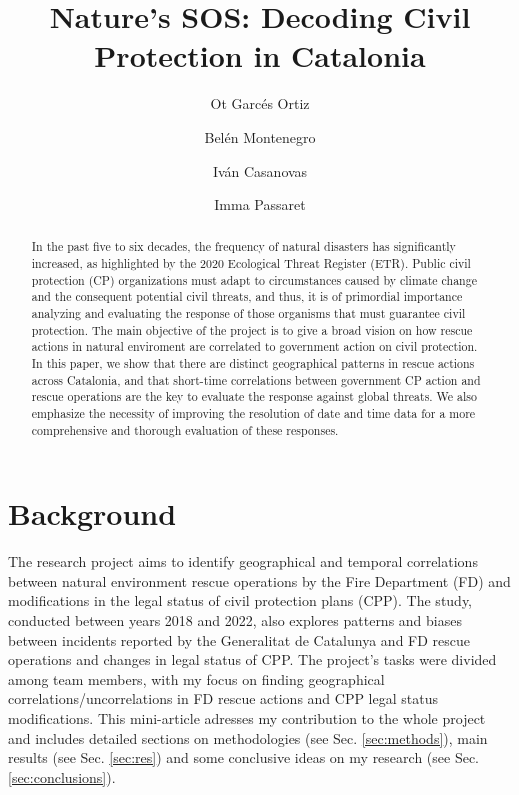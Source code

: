 \documentclass[
  journal=small,
  manuscript=mini-article,  %
  year=2023,
  volume=1,
]{odj-journal}
\title{Nature's SOS: Decoding Civil Protection in Catalonia}
\author{Ot Garcés Ortiz}
\affiliation{MSc Physics of Complex Systems and Biophysics}
\author{Belén Montenegro}
\affiliation{MSc Physics of Complex Systems and Biophysics}
\author{Iván Casanovas}
\affiliation{MSc Physics of Complex Systems and Biophysics}
\author{Imma Passaret}
\affiliation{MSc Physics of Complex Systems and Biophysics}
\begin{document}
\vspace{-0.5cm}
\begin{abstract}
In the past five to six decades, the frequency of natural disasters has significantly increased, as highlighted by the 2020 Ecological Threat Register (ETR). Public civil protection (CP) organizations must adapt to circumstances caused by climate change and the consequent potential civil threats, and thus, it is of primordial importance analyzing and evaluating the response of those organisms that must guarantee civil protection. The main objective of the project is to give a broad vision on how rescue actions in natural enviroment are correlated to government action on civil protection. In this paper, we show that there are distinct geographical patterns in rescue actions across Catalonia, and that short-time correlations between government CP action and rescue operations are the key to evaluate the response against global threats. We also emphasize the necessity of improving the resolution of date and time data for a more comprehensive and thorough evaluation of these responses.
\end{abstract}
\vspace{-1cm}
\section{Background}
The research project aims to identify geographical and temporal correlations between natural environment rescue operations by the Fire Department (FD) and modifications in the legal status of civil protection plans (CPP). The study, conducted between years 2018 and 2022, also explores patterns and biases between incidents reported by the Generalitat de Catalunya and FD rescue operations and changes in legal status of CPP. The project's tasks were divided among team members, with my focus on finding geographical correlations/uncorrelations in FD rescue actions and CPP legal status modifications. This mini-article adresses my contribution to the whole project and includes detailed sections on methodologies (see Sec. \ref{sec:methods}), main results (see Sec. \ref{sec:res}) and some conclusive ideas on my research (see Sec. \ref{sec:conclusions}). \\
\end{document}
